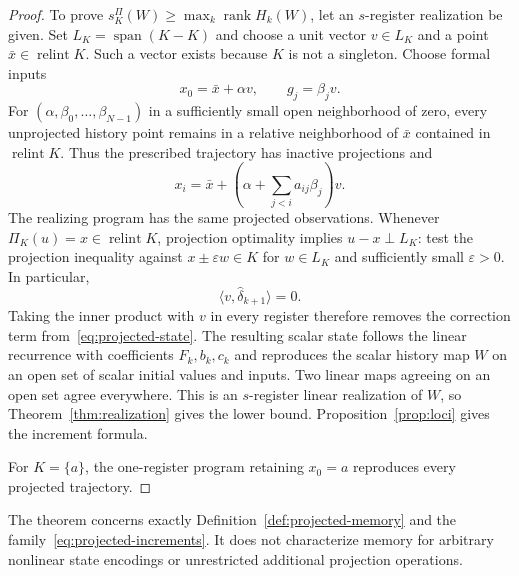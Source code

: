 \documentclass[11pt]{article}
\numberwithin{equation}{section}
\theoremstyle{definition}
\DeclareMathOperator{\rank}{rank}
\begin{document}
\begin{proof}
To prove $s_K^\Pi(W)\ge\max_k\rank H_k(W)$, let an $s$-register realization be given. Set $L_K=\operatorname{span}(K-K)$ and choose a unit vector $v\in L_K$ and a point $\bar x\in\operatorname{relint}K$. Such a vector exists because $K$ is not a singleton. Choose formal inputs
\[
 x_0=\bar x+\alpha v,\qquad g_j=\beta_jv.
\]
For $(\alpha,\beta_0,\ldots,\beta_{N-1})$ in a sufficiently small open neighborhood of zero, every unprojected history point remains in a relative neighborhood of $\bar x$ contained in $\operatorname{relint}K$. Thus the prescribed trajectory has inactive projections and
\[
 x_i=\bar x+\left(\alpha+\sum_{j<i}a_{ij}\beta_j\right)v.
\]
The realizing program has the same projected observations. Whenever $\Pi_K(u)=x\in\operatorname{relint}K$, projection optimality implies $u-x\perp L_K$: test the projection inequality against $x\pm\varepsilon w\in K$ for $w\in L_K$ and sufficiently small $\varepsilon>0$. In particular,
\[
 \langle v,\widehat\delta_{k+1}\rangle=0.
\]
Taking the inner product with $v$ in every register therefore removes the correction term from~\eqref{eq:projected-state}. The resulting scalar state follows the linear recurrence with coefficients $F_k,b_k,c_k$ and reproduces the scalar history map $W$ on an open set of scalar initial values and inputs. Two linear maps agreeing on an open set agree everywhere. This is an $s$-register linear realization of $W$, so Theorem~\ref{thm:realization} gives the lower bound. Proposition~\ref{prop:loci} gives the increment formula.

For $K=\{a\}$, the one-register program retaining $x_0=a$ reproduces every projected trajectory.
\end{proof}

The theorem concerns exactly Definition~\ref{def:projected-memory} and the family~\eqref{eq:projected-increments}. It does not characterize memory for arbitrary nonlinear state encodings or unrestricted additional projection operations.
\end{document}
